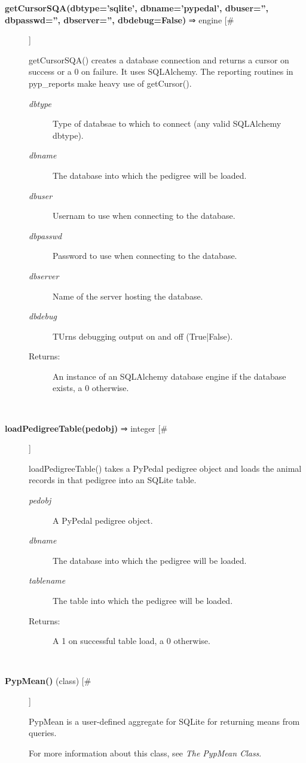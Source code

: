 \begin{description}
\item[\textbf{getCursorSQA(dbtype='sqlite', dbname='pypedal', dbuser='', dbpasswd='', dbserver='', dbdebug=False)} ⇒ engine [\#]
]
\par getCursorSQA() creates a database connection and returns a
cursor on success or a 0 on failure. It uses SQLAlchemy.
The reporting routines in pyp\_reports make heavy use of
getCursor().
\begin{description}
\item[\textit{dbtype}
]
Type of databsae to which to connect (any valid SQLAlchemy dbtype).
\item[\textit{dbname}
]
The database into which the pedigree will be loaded.
\item[\textit{dbuser}
]
Usernam to use when connecting to the database.
\item[\textit{dbpasswd}
]
Password to use when connecting to the database.
\item[\textit{dbserver}
]
Name of the server hosting the database.
\item[\textit{dbdebug}
]
TUrns debugging output on and off (True|False).
\item[Returns:
]
An instance of an SQLAlchemy database engine if the database exists, a 0 otherwise.
\end{description}\\

\item[\textbf{loadPedigreeTable(pedobj)} ⇒ integer [\#]
]
\par loadPedigreeTable() takes a PyPedal pedigree object and loads
the animal records in that pedigree into an SQLite table.
\begin{description}
\item[\textit{pedobj}
]
A PyPedal pedigree object.
\item[\textit{dbname}
]
The database into which the pedigree will be loaded.
\item[\textit{tablename}
]
The table into which the pedigree will be loaded.
\item[Returns:
]
A 1 on successful table load, a 0 otherwise.
\end{description}\\

\item[\textbf{PypMean()} (class) [\#]
]
\par PypMean is a user-defined aggregate for SQLite for returning means from queries.
\par For more information about this class, see \textit{The PypMean Class}.


\end{description}
